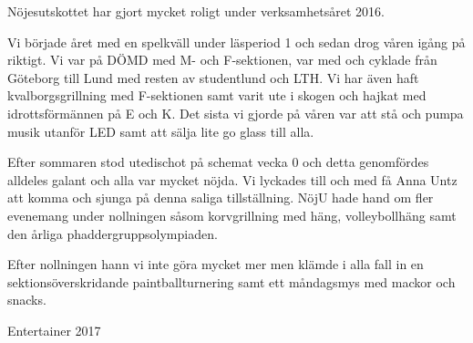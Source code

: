 \documentclass[../_main/handlingar.tex]{subfiles}
\begin{document}
Nöjesutskottet har gjort mycket roligt under verksamhetsåret 2016.

Vi började året med en spelkväll under läsperiod 1 och sedan drog våren igång på riktigt. Vi var på DÖMD med M- och F-sektionen, var med och cyklade från Göteborg till Lund med resten av studentlund och LTH. Vi har även haft kvalborgsgrillning med F-sektionen samt varit ute i skogen och hajkat med idrottsförmännen på E och K. Det sista vi gjorde på våren var att stå och pumpa musik utanför LED samt att sälja lite go glass till alla.

Efter sommaren stod utedischot på schemat vecka 0 och detta genomfördes alldeles galant och alla var mycket nöjda. Vi lyckades till och med få Anna Untz att komma och sjunga på denna saliga tillställning. NöjU hade hand om fler evenemang under nollningen såsom korvgrillning med häng, volleybollhäng samt den årliga phaddergruppsolympiaden.

Efter nollningen hann vi inte göra mycket mer men klämde i alla fall in en sektionsöverskridande paintballturnering samt ett måndagsmys med mackor och snacks.
\begin{signatures}{1}
    \mvh
    \signature{Albin Nyström Eklund}{Entertainer 2017}
\end{signatures}
\end{document}
